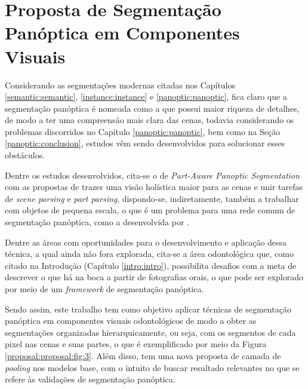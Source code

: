 \newpage
\clearpage

\section{Proposta de Segmentação Panóptica em Componentes Visuais}
\label{proposal:proposal}

Considerando as segmentações modernas citadas nos Capítulos \ref{semantic:semantic}, \ref{instance:instance} e \ref{panoptic:panoptic}, fica claro que a segmentação panóptica é nomeada como a que possui maior riqueza de detalhes, de modo a ter uma compreensão mais clara das cenas, todavia considerando os problemas discorridos no Capítulo \ref{panoptic:panoptic}, bem como na Seção \ref{panoptic:conclusion}, estudos vêm sendo desenvolvidos para solucionar esses obstáculos.

\begin{sloppypar}
Dentre os estudos desenvolvidos, cita-se o de \textit{Part-Aware Panoptic Segmentation} \cite{DeGeus2021} com as propostas de trazer uma visão holística maior para as cenas e unir tarefas de \textit{scene parsing} e \textit{part parsing}, dispondo-se, indiretamente, também a trabalhar com objetos de pequena escala, o que é um problema para uma rede comum de segmentação panóptica, como a desenvolvida por \cite{Kirillov2019a}.
\end{sloppypar}

Dentre as áreas com oportunidades para o desenvolvimento e aplicação dessa técnica, a qual ainda não fora explorada, cita-se a área odontológica que, como citado na Introdução (Capítulo \ref{intro:intro}), possibilita desafios com a meta de descrever o que há na boca a partir de fotografias orais, o que pode ser explorado por meio de um \textit{framework} de segmentação panóptica.

Sendo assim, este trabalho tem como objetivo aplicar técnicas de segmentação panóptica em componentes visuais odontológicos de modo a obter as segmentações organizadas hierarquicamente, ou seja, com os segmentos de cada pixel nas cenas e suas partes, o que é exemplificado por meio da Figura \ref{proposal:proposal:fig:3}. Além disso, tem uma nova proposta de camada de \textit{pooling} nos modelos base, com o intuito de buscar resultado relevantes no que se refere às validações de segmentação panóptica.

